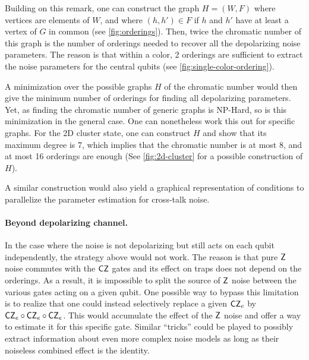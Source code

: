 Building on this remark, one can construct the graph \(H = (W,F)\) where vertices are elements of \(W\), and where \((h,h') \in F\) if \(h\) and \(h'\) have at least a vertex of \(G\) in common (see \cref{fig:orderings}). Then, twice the chromatic number of this graph is the number of orderings needed to recover all the depolarizing noise parameters. The reason is that within a color, 2 orderings are sufficient to extract the noise parameters for the central qubits (see \cref{fig:single-color-ordering}).





A minimization over the possible graphs \(H\) of the chromatic number would then give the minimum number of orderings for finding all depolarizing parameters. Yet, as finding the chromatic number of generic graphs is \textsf{NP-Hard}, so is this minimization in the general case. One can nonetheless work this out for specific graphs. For the 2D cluster state, one can construct \(H\) and show that its maximum degree is 7, which implies that the chromatic number is at most 8, and at most 16 orderings are enough (See \cref{fig:2d-cluster} for a possible construction of \(H\)).

A similar construction would also yield a graphical representation of conditions to parallelize the parameter estimation for cross-talk noise.



\paragraph{Beyond depolarizing channel.}
In the case where the noise is not depolarizing but still acts on each qubit independently, the strategy above would not work. The reason is that pure \(\mathsf{Z}\) noise commutes with the \(\mathsf{CZ}\) gates and its effect on traps does not depend on the orderings. As a result, it is impossible to split the source of \(\mathsf{Z}\) noise between the various gates acting on a given qubit. One possible way to bypass this limitation is to realize that one could instead selectively replace a given \(\mathsf{CZ}_e\) by \(\mathsf{CZ}_e \circ \mathsf{CZ}_e \circ \mathsf{CZ}_e\). This would accumulate the effect of the \(\mathsf{Z}\) noise and offer a way to estimate it for this specific gate. Similar ``tricks'' could be played to possibly extract information about even more complex noise models as long as their noiseless combined effect is the identity.

